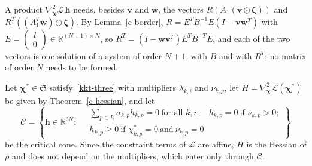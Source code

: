 \documentclass[11pt]{article}
\theoremstyle{plain}
\theoremstyle{remark}
\numberwithin{equation}{section}
\begin{document}
A product $\nabla^2_{\bm\chi}\mathcal{L}\,\bm h$ needs, besides $\bm v$ and
$\bm w$, the vectors $R\left(A_1\left(\bm v\odot\bm\zeta\right)\right)$ and
$R^T\left(\left(A_1^T\bm w\right)\odot\bm\zeta\right)$. By
Lemma~\ref{c-border}, $R=E^TB^{-1}E\left(I-\bm v\bm w^T\right)$ with
$E=\begin{pmatrix}I\\0\end{pmatrix}\in\mathbb{R}^{(N+1)\times N}$, so
$R^T=\left(I-\bm w\bm v^T\right)E^TB^{-T}E$, and each of the two vectors is one
solution of a system of order $N+1$, with $B$ and with $B^T$; no matrix of
order $N$ needs to be formed.

Let $\bm\chi^*\in\mathfrak{S}$ satisfy~\eqref{kkt-three} with multipliers
$\lambda_{k,i}$ and $\nu_{k,p}$, let $H=\nabla^2_{\bm\chi}\mathcal{L}(\bm\chi^*)$
be given by Theorem~\ref{c-hessian}, and let
\begin{equation}\label{c-cone}
\mathcal{C}=\left\{\bm h\in\mathbb{R}^{3N}:\
\begin{aligned}
&\textstyle\sum_{p\in I_i}\sigma_{k,p}h_{k,p}=0\ \text{for all }k,i;\quad
h_{k,p}=0\ \text{if }\nu_{k,p}>0;\\
&h_{k,p}\ge 0\ \text{if }\chi^*_{k,p}=0\ \text{and}\ \nu_{k,p}=0
\end{aligned}\right\}
\end{equation}
be the critical cone. Since the constraint terms of $\mathcal{L}$ are affine,
$H$ is the Hessian of $\rho$ and does not depend on the multipliers, which
enter only through $\mathcal{C}$.
\end{document}
